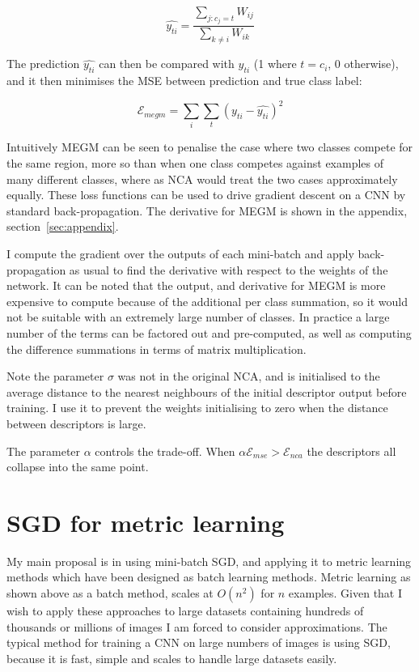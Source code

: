 \begin{equation}
\label{eq:megm_pred}
\hat{y_{ti}} = \frac{\sum_{j:c_j = t}W_{ij}}{\sum_{k \neq i}{W_{ik}}}
\end{equation}

The prediction $ \hat{y_{ti}} $ can then be compared with $ y_{ti} $ (1 where $ t = c_i $, 0 otherwise), and it then minimises the \gls{MSE} between prediction and true class label:

\begin{equation}
\label{eq:megm_loss}
\mathcal{E}_{megm} =  \sum_i\sum_t{(y_{ti} - \hat{y_{ti}})^2}
\end{equation}

Intuitively \gls{MEGM} can be seen to penalise the case where two classes compete for the same region,  more so than when one class competes against examples of many different classes, where as \gls{NCA} would treat the two cases approximately equally. These loss functions can be used to drive gradient descent on a \gls{CNN} by standard back-propagation. The derivative for \gls{MEGM} is shown in the appendix, section~\ref{sec:appendix}.

I compute the gradient over the outputs of each mini-batch and apply back-propagation as usual to find the derivative with respect to the weights of the network. It can be noted that the output, and derivative for \gls{MEGM} is more expensive to compute because of the additional per class summation, so it would not be suitable with an extremely large number of classes. In practice a large number of the terms can be factored out and pre-computed, as well as computing the difference summations in terms of matrix multiplication.

Note the parameter $ \sigma $ was not in the original NCA, and is initialised to the average distance to the nearest neighbours of the initial descriptor output before training. I use it to prevent the weights initialising to zero when the distance between descriptors is large.


The parameter $\alpha $ controls the trade-off. When $ \alpha \mathcal{E}_{mse} > \mathcal{E}_{nca} $ the descriptors all collapse into the same point.


\section{SGD for metric learning}

My main proposal is in using mini-batch \gls{SGD}, and applying it to metric learning methods which have been designed as batch learning methods. Metric learning as shown above as a batch method, scales at $ O(n^2) $ for $ n $ examples. Given that I wish to apply these approaches to large datasets containing hundreds of thousands or millions of images I am forced to consider approximations. The typical method for training a \gls{CNN} on large numbers of images is using \gls{SGD}, because it is fast, simple and scales to handle large datasets easily. 

